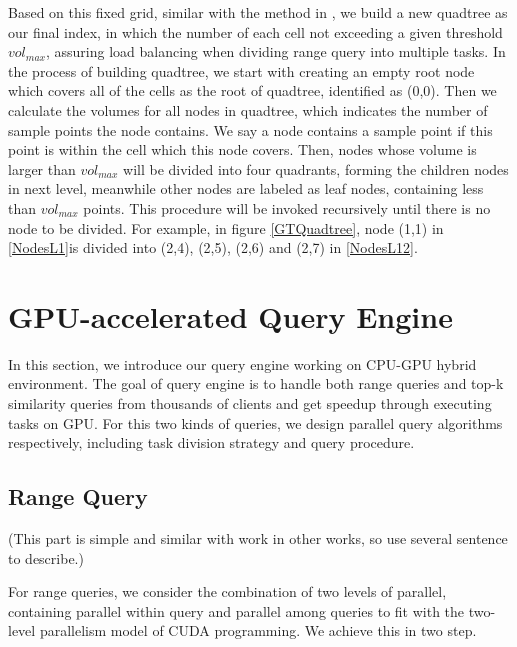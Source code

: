 \documentclass[conference]{IEEEtran}
\begin{document}
Based on this fixed grid, similar with the method in \cite{DBLP:conf/gis/LettichOS15}, we build a new quadtree as our final index, in which the number of each cell not exceeding a given threshold $vol_{max}$, assuring load balancing when dividing range query into multiple tasks. In the process of building quadtree, we start with creating an empty root node which covers all of the cells as the root of quadtree, identified as (0,0). Then we calculate the volumes for all nodes in quadtree, which indicates the number of sample points the node contains. We say a node contains a sample point if this point is within the cell which this node covers. Then, nodes whose volume is larger than $vol_{max}$ will be divided into four quadrants, forming the children nodes in next level, meanwhile other nodes are labeled as leaf nodes, containing less than $vol_{max}$ points. This procedure will be invoked recursively until there is no node to be divided. For example, in figure \ref{GTQuadtree}, node (1,1) in \ref{NodesL1}is divided into (2,4), (2,5), (2,6) and (2,7) in \ref{NodesL12}.





\section{GPU-accelerated Query Engine}
In this section, we introduce our query engine working on CPU-GPU hybrid environment. The goal of query engine is to handle both range queries and top-k similarity queries from thousands of clients and get speedup through executing tasks on GPU. For this two kinds of queries, we design parallel query algorithms respectively, including task division strategy and query procedure.

\subsection{Range Query}
(This part is simple and similar with work in other works, so use several sentence to describe.)

For range queries, we consider the combination of two levels of parallel, containing parallel within query and parallel among queries to fit with the two-level parallelism model of CUDA programming. We achieve this in two step. 
\end{document}
